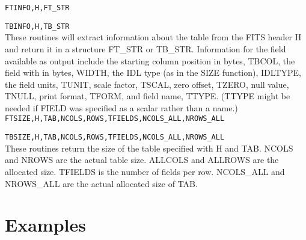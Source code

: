 \documentclass[twoside,12pt]{article}
\begin{document}
{\tt FTINFO,H,FT\_STR}

{\tt TBINFO,H,TB\_STR} \\
   
	These routines will extract information about the table from the FITS
        header H and return it in a structure FT\_STR or TB\_STR.    Information 
        for the field available as 
        output include the starting column position in bytes, TBCOL, 
        the field with in bytes, WIDTH, the IDL type (as in the SIZE 
        function), IDLTYPE, the field units, TUNIT, scale factor, 
        TSCAL, zero offset, TZERO, null value, TNULL, print format,
        TFORM, and field name, TTYPE.  (TTYPE might be needed if FIELD 
        was specified as a scalar rather than a name.)  \\
 
{\tt FTSIZE,H,TAB,NCOLS,ROWS,TFIELDS,NCOLS\_ALL,NROWS\_ALL} 

{\tt TBSIZE,H,TAB,NCOLS,ROWS,TFIELDS,NCOLS\_ALL,NROWS\_ALL} \\
 
	These routines return the size of the table specified with H
        and TAB.  NCOLS and NROWS are the actual table size.  ALLCOLS
	and ALLROWS are the allocated size.  TFIELDS is the number of
        fields per row.  NCOLS\_ALL and NROWS\_ALL are the actual
        allocated size of TAB.
 
\section{Examples}
 
\end{document}
